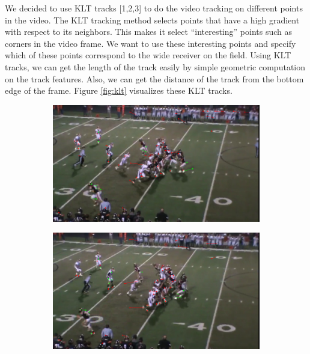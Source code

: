 \documentclass{article} %
\begin{document}
We decided to use KLT tracks [1,2,3] to do the video tracking on different points in the video. The KLT tracking method selects points that have a high gradient with respect to its neighbors. This makes it select ``interesting'' points such as corners in the video frame. We want to use these interesting points and specify which of these points correspond to the wide receiver on the field. Using KLT tracks, we can get the length of the track easily by simple geometric computation on the track features. Also, we can get the distance of the track from the bottom edge of the frame. Figure \ref{fig:klt} visualizes these KLT tracks.

\begin{figure}
\centering
 \begin{subfigure}{.32\textwidth}
  \centering
  \includegraphics[width=1\linewidth]{img/127.png}
 \end{subfigure}\hspace{.5em}%
 \begin{subfigure}{.32\textwidth}
  \centering
  \includegraphics[width=1\linewidth]{img/132.png}
 \end{subfigure}\hspace{.5em}%

\end{figure}
\end{document}

